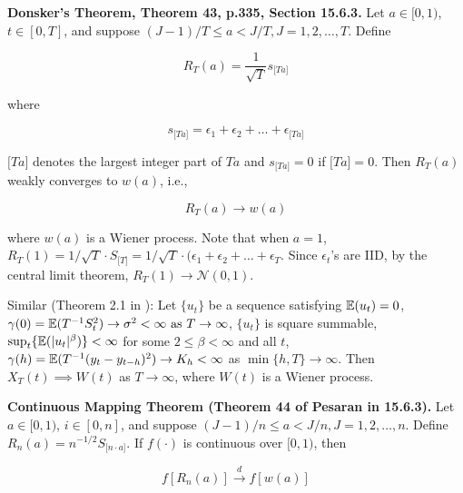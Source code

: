 \begin{theorem}\label{stoch.donsker}\textbf{Donsker's Theorem, Theorem 43, p.335, Section 15.6.3.} Let \(a \in [0, 1)\), \(t \in [0, T]\), and suppose \((J - 1)/T \leq a < J/T, J = 1, 2, \ldots, T\). Define

\[
R_T(a) = \frac{1}{\sqrt{T}} s_{ \big[Ta \big] }
\]

where

\[
s_{ \big[Ta \big] } = \epsilon_1 + \epsilon_2 + \ldots + \epsilon_{ \big[Ta \big] }
\]

\(\big[Ta \big]\) denotes the largest integer part of \(Ta\) and \(s_{ \big[Ta \big] } = 0\) if \(\big[Ta \big] = 0\). Then \(R_T(a)\) weakly converges to \(w(a)\), i.e., 

\[
R_T(a) \to w(a)
\]

where \(w(a)\) is a Wiener process. Note that when \(a = 1\), \(R_T(1) = 1/\sqrt{T} \cdot S_{\big[T \big]} = 1/\sqrt{T} \cdot (\epsilon_1 + \epsilon_2 + \ldots + \epsilon_T\). Since \(\epsilon_t\)'s are IID, by the central limit theorem, \(R_T(1) \to \mathcal{N}(0, 1)\). 

\end{theorem}

Similar (Theorem 2.1 in \citet{Phillips1986}): Let \(\{u_t\}\) be a sequence satisfying \(\E(u_t) = 0\), \( \gamma(0) = \E(T^{-1}S_t ^2) \to \sigma^2 < \infty \text{ as } T \to \infty\), \(\{u_t\}\) is square summable, \(\sup_t \{ \E( |u_t|^\beta) \} < \infty\) for some \(2 \leq \beta < \infty\) and all \(t\), \(\gamma(h) = \E(T^{-1}(y_t - y_{t-h})^2) \to K_h < \infty\) as \(\min \{h, T\} \to \infty\). Then \(X_T(t) \implies W(t)\) as \(T \to \infty\), where \(W(t)\) is a Wiener process.

\begin{theorem}\label{stoch.cont.map} \textbf{Continuous Mapping Theorem (Theorem 44 of Pesaran in 15.6.3).} Let \(a \in [0, 1)\), \(i \in [0, n]\), and suppose \((J-1)/n \leq a < J/n, J = 1, 2, \ldots, n\). Define \(R_n(a) = n^{-1/2} S_{\big[ n \cdot a \big] }\). If \(f(\cdot)\) is continuous over \([0, 1)\), then 

\[
f[R_n(a)] \xrightarrow{d} f[w(a)]
\]

\end{theorem}


%
%
%
%
%
%
%
%
%
%



%
%
%






